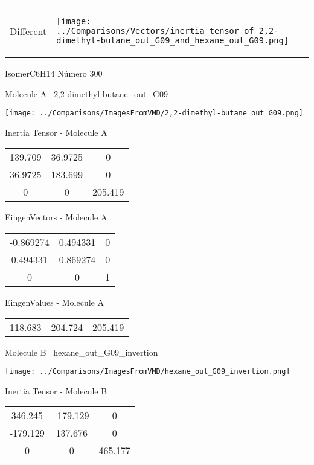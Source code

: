 \vtab[-5mm]
\begin{tabular}{*{2}{m{}}}
\begin{center}
\textcolor{NavyBlue}{\Large Different}
\end{center}
&
\begin{center}
\texttt{[image: ../Comparisons/Vectors/inertia\_tensor\_of\_2,2-dimethyl-butane\_out\_G09\_and\_hexane\_out\_G09.png]}
\end{center}
\end{tabular}

 \newpage

\vtab[-3cm]
\begin{center}
{\large IsomerC6H14 \tab Número 300}
\end{center}
\begin{multicols}{2}
\begin{center}

Molecule A \
2,2-dimethyl-butane\_out\_G09

\texttt{[image: ../Comparisons/ImagesFromVMD/2,2-dimethyl-butane\_out\_G09.png]}

Inertia Tensor - Molecule A \\
\begin{tabular}{|c c c|}
139.709	 & 	36.9725	 & 	0	 \\
36.9725	 & 	183.699	 & 	0	 \\
0	 & 	0	 & 	205.419
\end{tabular}

\vtab
 EingenVectors - Molecule A     \\
\begin{tabular}{|c c c|}
-0.869274	 & 	0.494331	 & 	0	 \\
0.494331	 & 	0.869274	 & 	0	 \\
0	 & 	0	 & 	1
\end{tabular}

\vtab
 EingenValues - Molecule A     \\
\begin{tabular}{|c c c|}
118.683	 & 	204.724	 & 	205.419	 \\
\end{tabular}
\columnbreak

Molecule B \
hexane\_out\_G09\_invertion

\texttt{[image: ../Comparisons/ImagesFromVMD/hexane\_out\_G09\_invertion.png]}

Inertia Tensor - Molecule B \\
\begin{tabular}{|c c c|}
346.245	 & 	-179.129	 & 	0	 \\
-179.129	 & 	137.676	 & 	0	 \\
0	 & 	0	 & 	465.177
\end{tabular}


\end{center}
\end{multicols}
